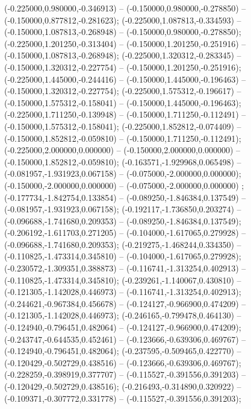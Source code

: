  (-0.225000,0.980000,-0.346913) -- (-0.150000,0.980000,-0.278850) -- (-0.150000,0.877812,-0.281623);
 (-0.225000,1.087813,-0.334593) -- (-0.150000,1.087813,-0.268948) -- (-0.150000,0.980000,-0.278850);
 (-0.225000,1.201250,-0.313404) -- (-0.150000,1.201250,-0.251916) -- (-0.150000,1.087813,-0.268948);
 (-0.225000,1.320312,-0.283345) -- (-0.150000,1.320312,-0.227754) -- (-0.150000,1.201250,-0.251916);
 (-0.225000,1.445000,-0.244416) -- (-0.150000,1.445000,-0.196463) -- (-0.150000,1.320312,-0.227754);
 (-0.225000,1.575312,-0.196617) -- (-0.150000,1.575312,-0.158041) -- (-0.150000,1.445000,-0.196463);
 (-0.225000,1.711250,-0.139948) -- (-0.150000,1.711250,-0.112491) -- (-0.150000,1.575312,-0.158041);
 (-0.225000,1.852812,-0.074409) -- (-0.150000,1.852812,-0.059810) -- (-0.150000,1.711250,-0.112491);
 (-0.225000,2.000000,0.000000) -- (-0.150000,2.000000,0.000000) -- (-0.150000,1.852812,-0.059810);
 (-0.163571,-1.929968,0.065498) -- (-0.081957,-1.931923,0.067158) -- (-0.075000,-2.000000,0.000000);
 (-0.150000,-2.000000,0.000000) -- (-0.075000,-2.000000,0.000000) ;
 (-0.177734,-1.842754,0.133854) -- (-0.089250,-1.846384,0.137549) -- (-0.081957,-1.931923,0.067158);
 (-0.192117,-1.736850,0.203274) -- (-0.096688,-1.741680,0.209353) -- (-0.089250,-1.846384,0.137549);
 (-0.206192,-1.611703,0.271205) -- (-0.104000,-1.617065,0.279928) -- (-0.096688,-1.741680,0.209353);
 (-0.219275,-1.468244,0.334350) -- (-0.110825,-1.473314,0.345810) -- (-0.104000,-1.617065,0.279928);
 (-0.230572,-1.309351,0.388873) -- (-0.116741,-1.313254,0.402913) -- (-0.110825,-1.473314,0.345810);
 (-0.239261,-1.140067,0.430810) -- (-0.121305,-1.142028,0.446973) -- (-0.116741,-1.313254,0.402913);
 (-0.244621,-0.967384,0.456678) -- (-0.124127,-0.966900,0.474209) -- (-0.121305,-1.142028,0.446973);
 (-0.246165,-0.799478,0.464130) -- (-0.124940,-0.796451,0.482064) -- (-0.124127,-0.966900,0.474209);
 (-0.243747,-0.644535,0.452461) -- (-0.123666,-0.639306,0.469767) -- (-0.124940,-0.796451,0.482064);
 (-0.237595,-0.509465,0.422770) -- (-0.120429,-0.502729,0.438516) -- (-0.123666,-0.639306,0.469767);
 (-0.228259,-0.398919,0.377707) -- (-0.115527,-0.391556,0.391203) -- (-0.120429,-0.502729,0.438516);
 (-0.216493,-0.314890,0.320922) -- (-0.109371,-0.307772,0.331778) -- (-0.115527,-0.391556,0.391203);
